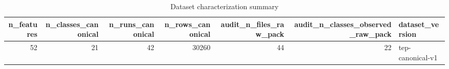 \begin{table}
\caption{Dataset characterization summary}
\label{tab:A6_exp-a4-v2__01_dataset_summary}
\begin{tabular}{rrrrrrl}
\toprule
n\_features & n\_classes\_canonical & n\_runs\_canonical & n\_rows\_canonical & audit\_n\_files\_raw\_pack & audit\_n\_classes\_observed\_raw\_pack & dataset\_version \\
\midrule
52 & 21 & 42 & 30260 & 44 & 22 & tep-canonical-v1 \\
\bottomrule
\end{tabular}
\end{table}
